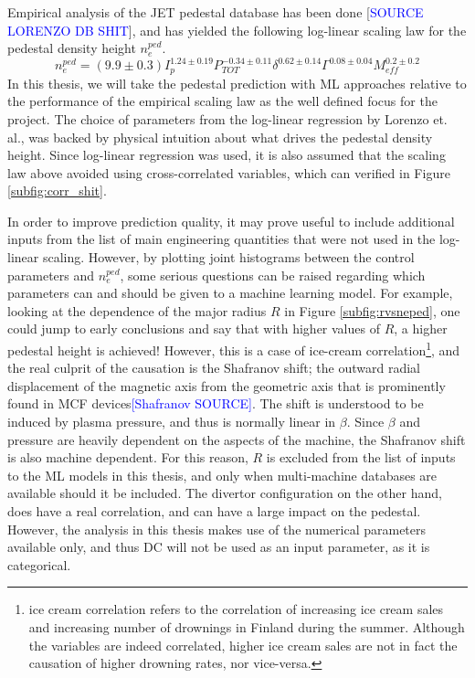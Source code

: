 \documentclass[a4paper, twoside, final, 12pt]{article}
\begin{document}
Empirical analysis of the JET pedestal database has been done [\textcolor{blue}{SOURCE LORENZO DB SHIT}], and has yielded the following log-linear scaling law for the pedestal density height $n_e^{ped}$.
\begin{equation} \label{eq:scaling}
	n_e^{ped} = (9.9 \pm 0.3) I_p^{1.24 \pm 0.19} P_{TOT}^{-0.34 \pm 0.11} \delta^{0.62 \pm 0.14} \Gamma^{ 0.08 \pm 0.04} M_{eff}^{0.2 \pm 0.2}
\end{equation}
In this thesis, we will take the pedestal prediction with ML approaches relative to the performance of the empirical scaling law as the well defined focus for the project.
The choice of parameters from the log-linear regression by Lorenzo et. al., was backed by physical intuition about what drives the pedestal density height. Since log-linear regression was used, it is also assumed that the scaling law above avoided using cross-correlated variables, which can verified in Figure \ref{subfig:corr_shit}. 

In order to improve prediction quality, it may prove useful to include additional inputs from the list of main engineering quantities that were not used in the log-linear scaling.
However, by plotting joint histograms between the control parameters and $n_e^{ped}$, some serious questions can be raised regarding which parameters can and should be given to a machine learning model.
For example, looking at the dependence of the major radius $R$ in Figure  \ref{subfig:rvsneped}, one could jump to early conclusions and say that with higher values of $R$, a higher pedestal height is achieved!
However, this is a case of ice-cream correlation\footnote{ice cream correlation refers to the correlation of increasing ice cream sales and increasing number of drownings in Finland during the summer. Although the variables are indeed correlated, higher ice cream sales are not in fact the causation of higher drowning rates, nor vice-versa.}, and the real culprit of the causation is the Shafranov shift; the outward radial displacement of the magnetic axis from the geometric axis that is prominently found in MCF devices\textcolor{blue}{[Shafranov SOURCE]}. The shift is understood to be induced by plasma pressure, and thus is normally linear in $\beta$. Since $\beta$ and pressure are heavily dependent on the aspects of the machine, the Shafranov shift is also machine dependent. 
For this reason, $R$ is excluded from the list of inputs to the ML models in this thesis, and only when multi-machine databases are available should it be included.
The divertor configuration on the other hand, does have a real correlation, and can have a large impact on the pedestal. However, the analysis in this thesis makes use of the numerical parameters available only, and thus DC will not be used as an input parameter, as it is categorical.  
\end{document}
